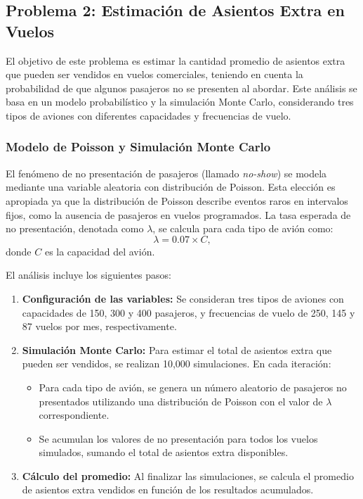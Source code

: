 \documentclass[12pt]{article}
\begin{document}
\subsection{Problema 2: Estimación de Asientos Extra en Vuelos}
El objetivo de este problema es estimar la cantidad promedio de asientos extra que pueden ser vendidos en vuelos comerciales, teniendo en cuenta la probabilidad de que algunos pasajeros no se presenten al abordar. Este análisis se basa en un modelo probabilístico y la simulación Monte Carlo, considerando tres tipos de aviones con diferentes capacidades y frecuencias de vuelo.

\subsubsection{Modelo de Poisson y Simulación Monte Carlo}
El fenómeno de no presentación de pasajeros (llamado \textit{no-show}) se modela mediante una variable aleatoria con distribución de Poisson. Esta elección es apropiada ya que la distribución de Poisson describe eventos raros en intervalos fijos, como la ausencia de pasajeros en vuelos programados. La tasa esperada de no presentación, denotada como $\lambda$, se calcula para cada tipo de avión como:
\[
\lambda = 0.07 \times C,
\]
donde $C$ es la capacidad del avión.

El análisis incluye los siguientes pasos:
\begin{enumerate}
    \item \textbf{Configuración de las variables:} Se consideran tres tipos de aviones con capacidades de 150, 300 y 400 pasajeros, y frecuencias de vuelo de 250, 145 y 87 vuelos por mes, respectivamente.
    \item \textbf{Simulación Monte Carlo:} Para estimar el total de asientos extra que pueden ser vendidos, se realizan 10,000 simulaciones. En cada iteración:
    \begin{itemize}
        \item Para cada tipo de avión, se genera un número aleatorio de pasajeros no presentados utilizando una distribución de Poisson con el valor de $\lambda$ correspondiente.
        \item Se acumulan los valores de no presentación para todos los vuelos simulados, sumando el total de asientos extra disponibles.
    \end{itemize}
    \item \textbf{Cálculo del promedio:} Al finalizar las simulaciones, se calcula el promedio de asientos extra vendidos en función de los resultados acumulados.
\end{enumerate}
\end{document}
